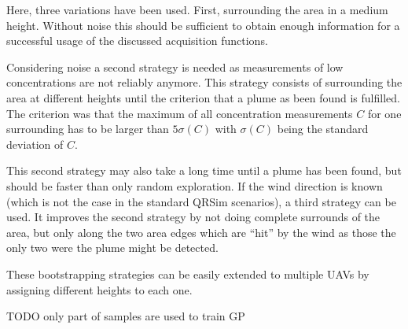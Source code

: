 \documentclass[11pt,a4paper,twoside,BCOR=15mm]{scrreprt}
\begin{document}
Here, three variations have been used. First, surrounding the area in a medium 
height. Without noise this should be sufficient to obtain enough information for 
a successful usage of the discussed acquisition functions.

Considering noise a second strategy is needed as measurements of low 
concentrations are not reliably anymore. This strategy consists of surrounding 
the area at different heights until the criterion that a plume as been found is 
fulfilled. The criterion was that the maximum of all concentration measurements 
$C$ for one surrounding has to be larger than $5\sigma(C)$ with $\sigma(C)$ 
being the standard deviation of $C$.

This second strategy may also take a long time until a plume has been found, but 
should be faster than only random exploration. If the wind direction is known 
(which is not the case in the standard QRSim scenarios), a third strategy can be 
used. It improves the second strategy by not doing complete surrounds of the 
area, but only along the two area edges which are ``hit'' by the wind as those 
the only two were the plume might be detected.

These bootstrapping strategies can be easily extended to multiple UAVs by 
assigning different heights to each one.

TODO only part of samples are used to train GP
\end{document}
